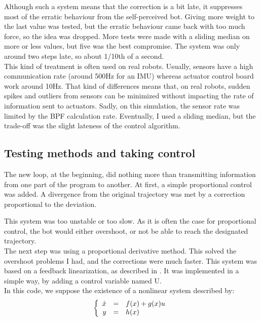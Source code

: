 Although such a system means that the correction is a bit late, it suppresses most of the erratic behaviour from the self-perceived bot.
Giving more weight to the last value was tested, but the erratic behaviour came back with too much force, so the idea was dropped.
More tests were made with a sliding median on more or less values, but five was the best compromise.
The system was only around two steps late, so about 1/10th of a second.\\

This kind of treatment is often used on real robots.
Usually, sensors have a high communication rate (around 500Hz for an IMU) whereas actuator control board work around 10Hz.
That kind of differences means that, on real robots, sudden spikes and outliers from sensors can be minimized without impacting the rate of information sent to actuators.
Sadly, on this simulation, the sensor rate was limited by the BPF calculation rate.
Eventually, I used a sliding median, but the trade-off was the slight lateness of the control algorithm.\\

\subsection{Testing methods and taking control}

The new loop, at the beginning, did nothing more than transmitting information from one part of the program to another.
At first, a simple proportional control was added. A divergence from the original trajectory was met by a correction proportional to the deviation.

This system was too unstable or too slow.
As it is often the case for proportional control, the bot would either overshoot, or not be able to reach the designated trajectory.\\

The next step was using a proportional derivative method. This solved the overshoot problems I had, and the corrections were much faster.
This system was based on a feedback linearization, as described in \parencite{ROBMOOC}.
It was implemented in a simple way, by adding a control variable named U.\\



In this code, we suppose the existence of a nonlinear system described by:\\

\begin{equation}
\left \{
\begin{array}{r c l}
   \dot{x} & = & f(x) + g(x)u \\
   y & = & h(x)
\end{array}
\right .
\end{equation}


